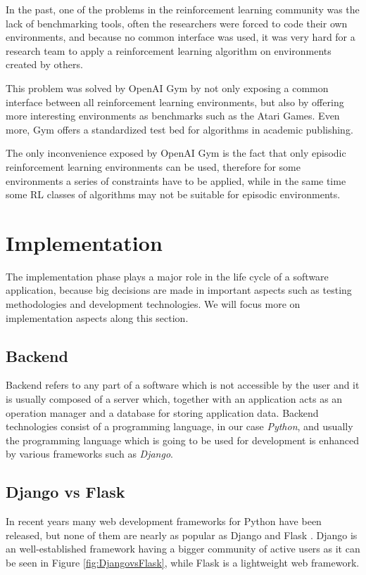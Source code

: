 In the past, one of the problems in the reinforcement learning community was the lack of benchmarking tools, often the researchers were forced to code their own environments, and because no common interface was used, it was very hard for a research team to apply a reinforcement learning algorithm on environments created by others. 
\par This problem was solved by OpenAI Gym by not only exposing a common interface between all reinforcement learning environments, but also by offering more interesting environments as benchmarks such as the Atari Games. Even more, Gym offers a standardized test bed for algorithms in academic publishing.
\par The only inconvenience exposed by OpenAI Gym is the fact that only episodic reinforcement learning environments can be used, therefore for some environments a series of constraints have to be applied, while in the same time some RL classes of algorithms may not be suitable for episodic environments.

\section{Implementation}\label{implementation}
The implementation phase plays a major role in the life cycle of a software application, because big decisions are made in important aspects such as testing methodologies and development technologies. We will focus more on implementation aspects along this section.

\subsection{Backend}\label{BE}
Backend refers to any part of a software which is not accessible by the user and it is usually composed of a server which, together with an application acts as an operation manager and a database for storing application data. Backend technologies consist of a programming language, in our case \emph{Python}, and usually the programming language which is going to be used for development is enhanced by various frameworks such as \emph{Django}.

\subsection{Django vs Flask}

In recent years many web development frameworks for Python have been released, but none of them are nearly as popular as Django \cite{django} and Flask \cite{flask}. 
Django is an well-established framework having a bigger community of active users as it can be seen in Figure \ref{fig:DjangovsFlask}\cite{flaskvsdjango}, while Flask is a lightweight web framework.

